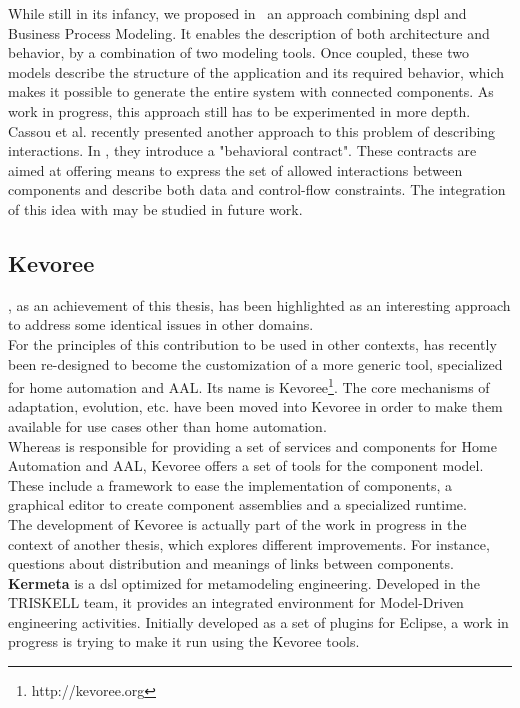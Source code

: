 While still in its infancy, we proposed in~\cite{Istoan09a} an approach combining \gls{dspl} and Business Process Modeling. It enables the description of both architecture and behavior, by a combination of two modeling tools. Once coupled, these two models describe the structure of the application and its required behavior, which makes it possible to generate the entire system with connected components. As work in progress, this approach still has to be experimented in more depth.\\
Cassou et al. recently presented another approach to this problem of describing interactions. In \cite{Cassou:2011}, they introduce a "behavioral contract". These contracts are aimed at offering means to express the set of allowed interactions between components and describe both data and control-flow constraints. The integration of this idea with \enti{} may be studied in future work.


\subsection{Kevoree}

\enti{}, as an achievement of this thesis, has been highlighted as an interesting approach to address some identical issues in other domains.\\

For the principles of this contribution to be used in other contexts, \enti{} has recently been re-designed to become the customization of a more generic tool, specialized for home automation and AAL. Its name is Kevoree\footnote{http://kevoree.org}. The core mechanisms of adaptation, evolution, etc. have been moved into Kevoree in order to make them available for use cases other than home automation.\\

Whereas \enti{} is responsible for providing a set of services and components for Home Automation and AAL, Kevoree offers a set of tools for the component model. These include a framework to ease the implementation of components, a graphical editor to create component assemblies and a specialized runtime.\\
The development of Kevoree is actually part of the work in progress in the context of another thesis, which explores different improvements. For instance, questions about distribution and meanings of links between components.\\

{\bf Kermeta} is a \gls{dsl} optimized for metamodeling engineering. Developed in the TRISKELL team, it provides an integrated environment for Model-Driven engineering activities. Initially developed as a set of plugins for Eclipse, a work in progress is trying to make it run using the Kevoree tools.\\

